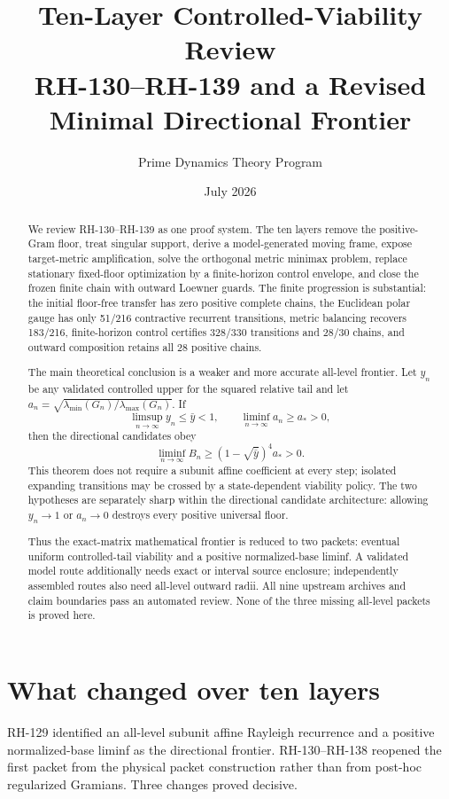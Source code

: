 \documentclass[12pt]{article}
\title{Ten-Layer Controlled-Viability Review\\\large RH-130--RH-139 and a Revised Minimal Directional Frontier}
\author{Prime Dynamics Theory Program}
\date{July 2026}
\begin{document}
\maketitle

\begin{abstract}
We review RH-130--RH-139 as one proof system.  The ten layers remove the
positive-Gram floor, treat singular support, derive a model-generated moving
frame, expose target-metric amplification, solve the orthogonal metric
minimax problem, replace stationary fixed-floor optimization by a
finite-horizon control envelope, and close the frozen finite chain with
outward Loewner guards.  The finite progression is substantial: the initial
floor-free transfer has zero positive complete chains, the Euclidean polar
gauge has only 51/216 contractive recurrent transitions, metric balancing
recovers 183/216, finite-horizon control certifies 328/330 transitions and
28/30 chains, and outward composition retains all 28 positive chains.

The main theoretical conclusion is a weaker and more accurate all-level
frontier.  Let $y_n$ be any validated controlled upper for the squared
relative tail and let
$a_n=\sqrt{\lambda_{\min}(G_n)/\lambda_{\max}(G_n)}$.  If
\[
 \limsup_{n\to\infty}y_n\leq \bar y<1,
 \qquad
 \liminf_{n\to\infty}a_n\geq a_*>0,
\]
then the directional candidates obey
\[
 \liminf_{n\to\infty}B_n
 \geq(1-\sqrt{\bar y})^4a_*>0.
\]
This theorem does not require a subunit affine coefficient at every step;
isolated expanding transitions may be crossed by a state-dependent viability
policy.  The two hypotheses are separately sharp within the directional
candidate architecture: allowing $y_n\to1$ or $a_n\to0$ destroys every
positive universal floor.

Thus the exact-matrix mathematical frontier is reduced to two packets:
eventual uniform controlled-tail viability and a positive normalized-base
liminf.  A validated model route additionally needs exact or interval source
enclosure; independently assembled routes also need all-level outward radii.
All nine upstream archives and claim boundaries pass an automated review.
None of the three missing all-level packets is proved here.
\end{abstract}

\section{What changed over ten layers}
RH-129 identified an all-level subunit affine Rayleigh recurrence and a
positive normalized-base liminf as the directional frontier.  RH-130--RH-138
reopened the first packet from the physical packet construction rather than
from post-hoc regularized Gramians.  Three changes proved decisive.
\end{document}
